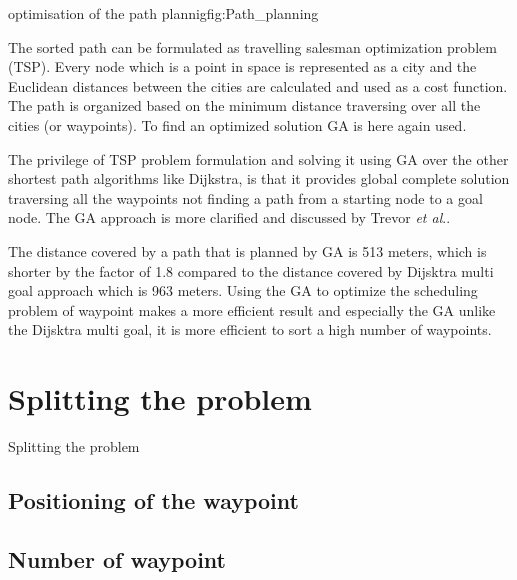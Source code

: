  \begin{mfigures}[!]{optimisation of the path plannig}{fig:Path_planning} \centering
{}
\hspace{1cm}
\end{mfigures} 

The sorted path can be formulated as travelling salesman optimization problem  
(TSP).
Every node which is a point in space is represented as a city and the Euclidean distances between the cities are calculated and used as a cost function. The path is organized based on the minimum distance traversing over all the cities (or waypoints). To find an optimized solution GA is here again used.

The privilege of TSP problem formulation and solving it using GA over the other shortest path algorithms like Dijkstra, is that it provides global  complete solution traversing all the waypoints not finding a path from a starting node  to a goal node. The GA approach is more clarified and discussed by Trevor \textit{et al}.\cite{GA_Path}. 


The distance covered by a path that is planned by GA is 513 meters, which is shorter by the factor of 1.8 compared to the distance covered by Dijsktra multi goal approach which is 963 meters. Using the GA  to optimize  the scheduling problem of waypoint makes a more efficient result and especially the GA unlike the Dijsktra multi goal, it is more efficient to sort a high number of waypoints.\\ 








\section{Splitting the problem }
	Splitting the problem 
			\subsection{Positioning of the waypoint }
			
			\subsection{Number of waypoint }

